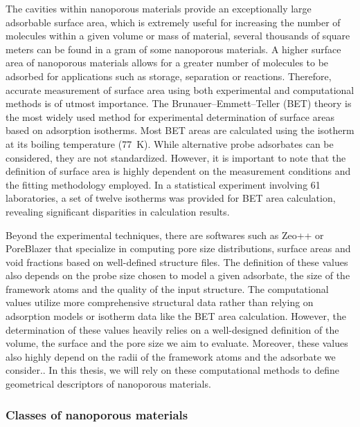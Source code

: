 \documentclass[main.tex]{subfiles}
\begin{document}
The cavities within nanoporous materials provide an exceptionally large adsorbable surface area, which is extremely useful for increasing the number of molecules within a given volume or mass of material, several thousands of square meters can be found in a gram of some nanoporous materials.\autocite{Farha_2012} A higher surface area of nanoporous materials allows for a greater number of molecules to be adsorbed for applications such as storage, separation or reactions. Therefore, accurate measurement of surface area using both experimental and computational methods is of utmost importance. The Brunauer–Emmett–Teller (BET) theory is the most widely used method for experimental determination of surface areas based on adsorption isotherms.\autocite{Detsi_2011} Most BET areas are calculated using the  isotherm at its boiling temperature (\SI{77}{\kelvin}). While alternative probe adsorbates can be considered, they are not standardized.\autocite{Tian_2017} However, it is important to note that the definition of surface area is highly dependent on the measurement conditions and the fitting methodology employed. In a statistical experiment involving 61 laboratories, a set of twelve isotherms was provided for BET area calculation, revealing significant disparities in calculation results.\autocite{Osterrieth_2022} 

Beyond the experimental techniques, there are softwares such as Zeo++ or PoreBlazer that specialize in computing pore size distributions, surface areas and void fractions based on well-defined structure files.\autocite{Zeo++,PoreBlazer} The definition of these values also depends on the probe size chosen to model a given adsorbate, the size of the framework atoms and the quality of the input structure. The computational values utilize more comprehensive structural data rather than relying on adsorption models or isotherm data like the BET area calculation. However, the determination of these values heavily relies on a well-designed definition of the volume, the surface and the pore size we aim to evaluate. Moreover, these values also highly depend on the radii of the framework atoms and the adsorbate we consider.\autocite{Hung_2021}. In this thesis, we will rely on these computational methods to define geometrical descriptors of nanoporous materials.

\subsubsection{Classes of nanoporous materials}
\end{document}
